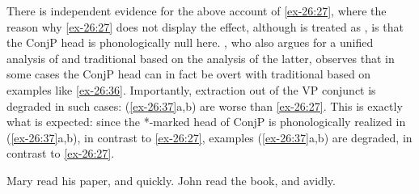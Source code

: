 \documentclass[output=paper]{langsci/langscibook}
\begin{document}
There is independent evidence for the above account of \eqref{ex-26:27},
where the reason why \eqref{ex-26:27} does not display the
 effect, although  is treated as
, is that the ConjP head is phonologically null here.
\textcite{Progovac1998,Progovac1999}, who also argues for a unified analysis of
 and traditional  based on the
 analysis of the latter, observes that in some cases the
ConjP head can in fact be overt with traditional  based on
examples like \eqref{ex-26:36}. Importantly, extraction out of the VP
conjunct is degraded in such cases: (\ref{ex-26:37}a,b) are worse than
\eqref{ex-26:27}. This is exactly what is expected: since the *-marked head
of ConjP is phonologically realized in (\ref{ex-26:37}a,b), in contrast to
\eqref{ex-26:27}, examples (\ref{ex-26:37}a,b) are degraded, in
contrast to \eqref{ex-26:27}.

\begin{exe}
\ex\label{ex-26:36}
	\ea Mary read his paper, and quickly.
	\ex John read the book, and avidly.
	\z
\ex\label{ex-26:37}
	\z
\end{exe}
\end{document}
